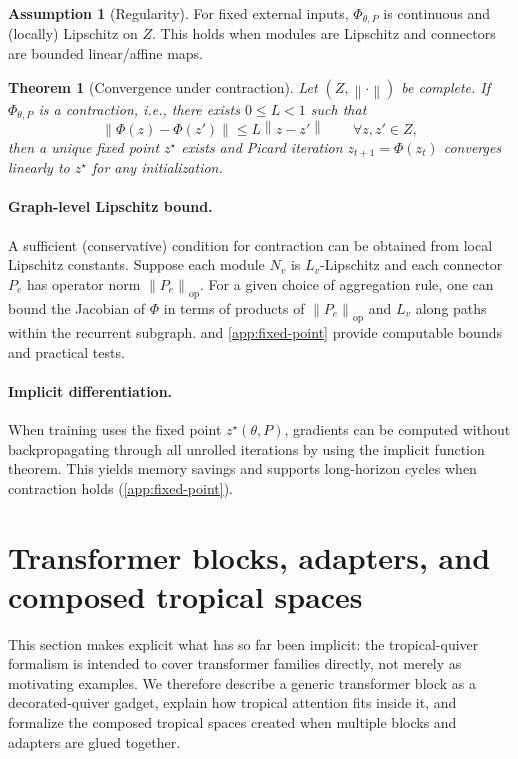 \documentclass[11pt]{article}
\theoremstyle{definition}
\newtheorem{assumption}{Assumption}[section]
\theoremstyle{plain}
\newtheorem{theorem}{Theorem}[section]
\theoremstyle{remark}
\newcommand{\norm}[1]{\left\lVert #1 \right\rVert}
\newcommand{\opnorm}[1]{\left\lVert #1 \right\rVert_{\mathrm{op}}}
\begin{document}
\begin{assumption}[Regularity]
For fixed external inputs, $\Phi_{\theta,P}$ is continuous and (locally) Lipschitz on $Z$.
This holds when modules are Lipschitz and connectors are bounded linear/affine maps.
\end{assumption}

\begin{theorem}[Convergence under contraction]
\label{thm:contraction}
Let $(Z,\norm{\cdot})$ be complete.
If $\Phi_{\theta,P}$ is a contraction, i.e.,
there exists $0\le L<1$ such that
\[
\norm{\Phi(z)-\Phi(z')} \le L\norm{z-z'}\qquad \forall z,z'\in Z,
\]
then a unique fixed point $z^\star$ exists and Picard iteration $z_{t+1}=\Phi(z_t)$ converges linearly to $z^\star$ for any initialization.
\end{theorem}

\paragraph{Graph-level Lipschitz bound.}
A sufficient (conservative) condition for contraction can be obtained from local Lipschitz constants.
Suppose each module $N_v$ is $L_v$-Lipschitz and each connector $P_e$ has operator norm $\opnorm{P_e}$.
For a given choice of aggregation rule, one can bound the Jacobian of $\Phi$ in terms of products of $\opnorm{P_e}$ and $L_v$ along paths within the recurrent subgraph.
 and \cref{app:fixed-point} provide computable bounds and practical tests.

\paragraph{Implicit differentiation.}
When training uses the fixed point $z^\star(\theta,P)$, gradients can be computed without backpropagating through all unrolled iterations by using the implicit function theorem.
This yields memory savings and supports long-horizon cycles when contraction holds (\cref{app:fixed-point}).

\newpage

\section{Transformer blocks, adapters, and composed tropical spaces}
\label{sec:transformer-tropical}

This section makes explicit what has so far been implicit:
the tropical-quiver formalism is intended to cover transformer families directly, not merely as motivating examples.
We therefore describe a generic transformer block as a decorated-quiver gadget, explain how tropical attention fits inside it, and formalize the composed tropical spaces created when multiple blocks and adapters are glued together.
\end{document}
